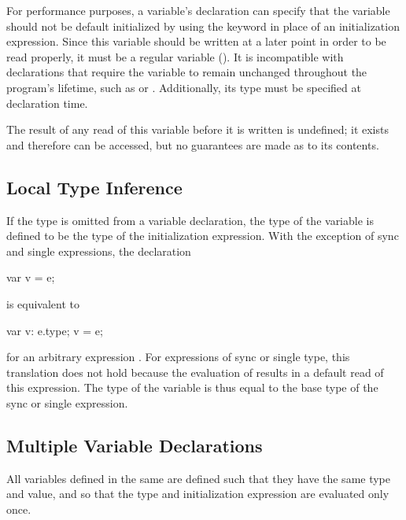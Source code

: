 For performance purposes, a variable's declaration can specify that
the variable should not be default initialized by using
the  keyword in place of an initialization expression.
Since this variable should be written at a later point in order to be
read properly, it must be a regular variable ().  It is
incompatible with declarations that require the variable to remain
unchanged throughout the program's lifetime, such as 
or .  Additionally, its type must be specified at
declaration time.

The result of any read of this variable before it is written is
undefined; it exists and therefore can be accessed, but no guarantees
are made as to its contents.

\subsection{Local Type Inference}
\label{Local_Type_Inference}

If the type is omitted from a variable declaration, the type of the
variable is defined to be the type of the initialization expression.
With the exception of sync and single expressions, the declaration
\begin{chapel}
var v = e;
\end{chapel}
is equivalent to
\begin{chapel}
var v: e.type;
v = e;
\end{chapel}
for an arbitrary expression .  For expressions of sync or
single type, this translation does not hold because the evaluation
of  results in a default read of this expression.  The type of
the variable is thus equal to the base type of the sync or single
expression.

\subsection{Multiple Variable Declarations}
\label{Multiple_Variable_Declarations}

All variables defined in the same  are defined
such that they have the same type and value, and so that the type and
initialization expression are evaluated only once.

